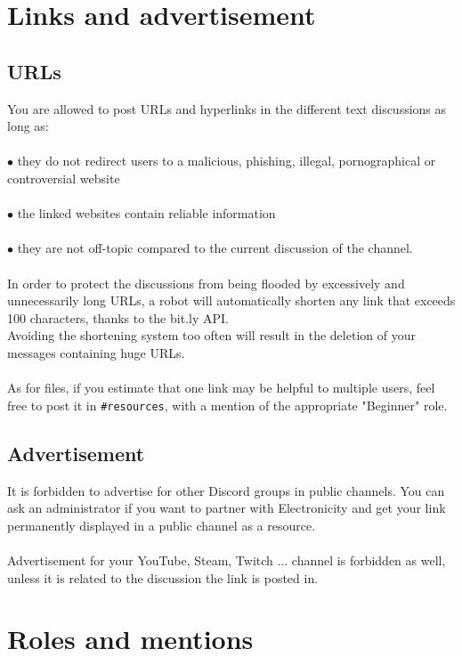 \documentclass[a4paper]{article}
\begin{document}
\section{Links and advertisement}

\subsection{URLs}
You are allowed to post URLs and hyperlinks in the different text discussions as long as:\\\\
$\bullet$ they do not redirect users to a malicious, phishing, illegal, pornographical or controversial website\\\\
$\bullet$ the linked websites contain reliable information\\\\
$\bullet$ they are not off-topic compared to the current discussion of the channel.\\\\
In order to protect the discussions from being flooded by excessively and unnecessarily long URLs, a robot will automatically shorten any link that exceeds 100 characters, thanks to the bit.ly API.\\
Avoiding the shortening system too often will result in the deletion of your messages containing huge URLs.\\\\
As for files, if you estimate that one link may be helpful to multiple users, feel free to post it in \texttt{\#resources}, with a mention of the appropriate "Beginner" role.

\subsection{Advertisement}
It is forbidden to advertise for other Discord groups in public channels. You can ask an administrator if you want to partner with Electronicity and get your link permanently displayed in a public channel as a resource.\\\\
Advertisement for your YouTube, Steam, Twitch ... channel is forbidden as well, unless it is related to the discussion the link is posted in.
\pagebreak

\section{Roles and mentions}
\end{document}
